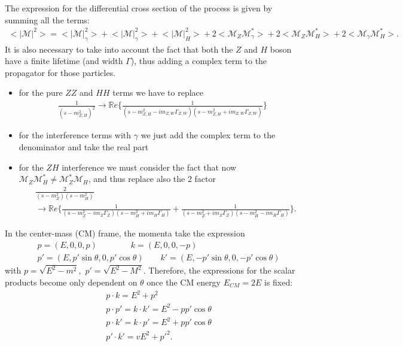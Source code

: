 \documentclass[12pt,letterpaper]{article}
\newcommand{\avg}[1]{\big<#1\big>}
\begin{document}
The expression for the differential cross section of the process is given by summing all the terms:
\begin{align*}
\avg{|\mathcal{M}|^2} = \avg{|\mathcal{M}|_{\gamma}^2} + \avg{|\mathcal{M}|_{\gamma}^2} + \avg{|\mathcal{M}|_{H}^2} +2\avg{\mathcal{M}_Z \mathcal{M}_{\gamma}^*} + 2\avg{\mathcal{M}_Z\mathcal{M}_H^*} + 2\avg{\mathcal{M}_{\gamma}\mathcal{M}_H^*}.
\end{align*}
It is also necessary to take into account the fact that both the $Z$ and $H$ boson have a finite lifetime (and width $\Gamma$), thus adding a complex term to the propagator for those particles.
\begin{itemize}
\item for the pure $ZZ$ and $HH$ terms we have to replace
\begin{align*}
\frac{1}{(s-m_{Z,H}^2)^2} \rightarrow \mathbb{R}e \bigg\{ \frac{1}{(s-m_{Z,H}^2-im_{Z,W}\Gamma_{Z,W})(s-m_{Z,H}^2+im_{Z,W}\Gamma_{Z,W})}  \bigg\}
\end{align*}
\item for the interference terms with $\gamma$ we just add the complex term to the denominator and take the real part
\item for the $ZH$ interference we must consider the fact that now $\mathcal{M}_Z\mathcal{M}_H^*\neq\mathcal{M}_Z^*\mathcal{M}_H$, and thus replace also the 2 factor
\begin{align*}
&\frac{2}{(s-m_Z^2)(s-m_H^2)}\\
&\rightarrow \mathbb{R}e\bigg\{ 
\frac{1}{(s-m_Z^2-im_Z\Gamma_Z)(s-m_H^2+im_H\Gamma_H)} + \frac{1}{(s-m_Z^2+im_Z\Gamma_Z)(s-m_H^2-im_H\Gamma_H)}
\bigg\}.
\end{align*}
\end{itemize}

In the center-mass (CM) frame, the momenta take the expression 
\begin{align*}
&p = (E,0,0,p) \qquad\qquad k = (E,0,0,-p)\\
&p' = (E,p'\sin\theta,0,p'\cos\theta)\qquad k' = (E,-p'\sin\theta,0,-p'\cos\theta)
\end{align*}
with $p = \sqrt{E^2 - m^2},$  $p' = \sqrt{E^2-M^2}$. Therefore, the expressions for the scalar products become only dependent on $\theta$ once the CM energy $E_{CM}=2E$ is fixed:
\begin{align*}
&p\cdot k = E^2+p^2\\
&p\cdot p' = k\cdot k' = E^2-pp'\cos\theta\\
&p\cdot k' = k \cdot p' = E^2 + pp'\cos\theta\\
&p'\cdot k' =vE^2 + p'^2. \\
\end{align*}
\end{document}
